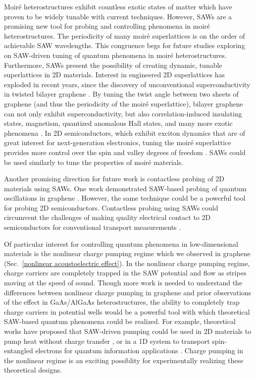 \documentclass[double,12pt,1in,seploa]{beavtex}
\begin{document}
Moiré heterostructures exhibit countless exotic states of matter which have proven to be widely tunable with current techniques. However, SAWs are a promising new tool for probing and controlling phenomena in moiré heterostructures. The periodicity of many moiré superlattices is on the order of achievable SAW wavelengths. This congruence begs for future studies exploring on SAW-driven tuning of quantum phenomena in moiré heterostructures. Furthermore, SAWs present the possibility of creating dynamic, tunable superlattices in 2D materials. Interest in engineered 2D superlattices has exploded in recent years, since the discovery of unconventional superconductivity in twisted bilayer graphene \cite{cao_unconventional_2018}. By tuning the twist angle between two sheets of graphene (and thus the periodicity of the moiré superlattice), bilayer graphene can not only exhibit superconductivity, but also correlation-induced insulating states, magnetism, quantized anomalous Hall states, and many more exotic phenomena \cite{andrei_graphene_2020}. In 2D semiconductors, which exhibit exciton dynamics that are of great interest for next-generation electronics, tuning the moiré superlattice provides more control over the spin and valley degrees of freedom \cite{ciarrocchi_excitonic_2022}. SAWs could be used similarly to tune the properties of moiré materials. 

Another promising direction for future work is contactless probing of 2D materials using SAWs. One work demonstrated SAW-based probing of quantum oscillations in graphene \cite{fang_quantum_2023}. However, the same technique could be a powerful tool for probing 2D semiconductors. Contactless probing using SAWs could circumvent the challenges of making quality electrical contact to 2D semiconductors for conventional transport measurements \cite{miao_recent_2022}. 

Of particular interest for controlling quantum phenomena in low-dimensional materials is the nonlinear charge pumping regime which we observed in graphene (Sec.\ \ref{nonlinear acoustoelectric effect}). In the nonlinear charge pumping regime, charge carriers are completely trapped in the SAW potential and flow as stripes moving at the speed of sound. Though more work is needed to understand the differences between nonlinear charge pumping in graphene and prior observations of the effect in GaAs/AlGaAs heterostructures, the ability to completely trap charge carriers in potential wells would be a powerful tool with which theoretical SAW-based quantum phenomena could be realized. For example, theoretical works have proposed that SAW-driven pumping could be used in 2D materials to pump heat without charge transfer \cite{andreev_electronic_2022}, or in a 1D system to transport spin-entangled electrons for quantum information applications \cite{giavaras_quantum_2006}. Charge pumping in the nonlinear regime is an exciting possiblity for experimentally realizing these theoretical designs.
\end{document}
